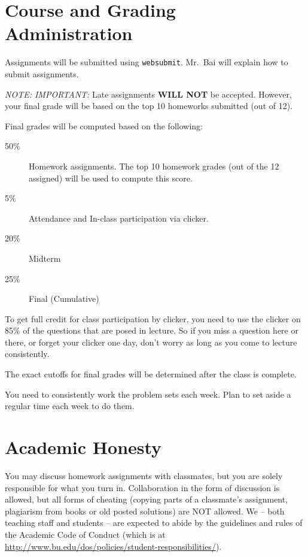\documentclass[11pt]{article}
\begin{document}
\section*{Course and Grading Administration}

Assignments will be submitted using \texttt{websubmit}.   Mr.\ Bai will
explain how to submit assignments.  

\emph{NOTE: IMPORTANT:} Late assignments \textbf{WILL NOT} be accepted.   However, your final
grade will be based on the top 10 homeworks submitted (out of 12).   

Final grades will be computed based on the following:
\begin{description}
\item[50\%] Homework assignments.  The top 10 homework grades (out of the
  12 assigned) will be used to compute this score.
\item[5\%] Attendance and In-class participation via clicker.
\item[20\%] Midterm
\item[25\%] Final (Cumulative)
\end{description}

To get full credit for class participation by clicker, you need to use
the clicker on 85\% of the questions that are posed in lecture.   So if
you miss a question here or there, or forget your clicker one day, don't
worry as long as you come to lecture consistently.

The exact cutoffs for final grades will be determined after the class is
complete.

You need to consistently work the problem sets each week.   Plan
  to set aside a regular time each week to do them.

\newpage

\section*{Academic Honesty}

You may discuss homework assignments with classmates, but you are 
solely responsible for what you turn in. Collaboration in the form of
discussion is allowed, but all forms of cheating (copying parts of a
classmate's assignment, plagiarism from books or old posted solutions)
are NOT allowed. We -- both teaching staff and students -- are expected
to abide by the guidelines and rules of the Academic Code of Conduct
(which is at
\url{http://www.bu.edu/dos/policies/student-responsibilities/}).
\end{document}
